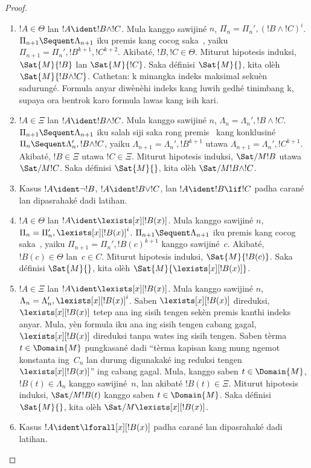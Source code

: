 \documentclass[../../../include/open-logic-section]{subfiles}
\begin{document}
\begin{proof}
\begin{enumerate}
  \item $!A \in \Theta$ lan $!A \ident !B \land !C$.
  Mula kanggo sawijiné $n$,
  $\Pi_n = \Pi_n', (!B \land !C)^i$.
  $\Pi_{n+1} \Sequent \Lambda_{n+1}$ iku premis
  kang cocog saka~\LeftR{\land}, yaiku
  $\Pi_{n+1} = \Pi_n', !B^{k+1}, !C^{k+2}$.
  Akibaté, $!B, !C \in \Theta$. Miturut hipotesis
  induksi, $\Sat{M}{!B}$ lan $\Sat{M}{!C}$.
  Saka définisi $\Sat{M}{}$, kita olèh
  $\Sat{M}{!B \land !C}$.
Cathetan: k minangka indeks maksimal sekuèn sadurungé. Formula anyar diwènèhi indeks kang luwih gedhé tinimbang k, supaya ora bentrok karo formula lawas kang isih kari.

  \item $!A \in \Xi$ lan $!A \ident !B \land !C$.
  Mula kanggo sawijiné $n$,
  $\Lambda_n = \Lambda_n', !B \land !C$.
  $\Pi_{n+1} \Sequent \Lambda_{n+1}$ iku salah siji
  saka rong premis~\RightR{\land} kang konklusiné
  $\Pi_n \Sequent \Lambda'_n, !B \land !C$, yaiku
  $\Lambda_{n+1} = \Lambda_n', !B^{k+1}$ utawa
  $\Lambda_{n+1} = \Lambda_n', !C^{k+1}$.
  Akibaté, $!B \in \Xi$ utawa $!C \in \Xi$.
  Miturut hipotesis induksi, $\Sat/{M}{!B}$ utawa
  $\Sat/{M}{!C}$. Saka définisi $\Sat{M}{}$,
  kita olèh $\Sat/{M}{!B \land !C}$.
  
  \item Kasus $!A \ident \lnot !B$,
  $!A \ident !B \lor !C$, lan
  $!A \ident !B \lif !C$ padha carané lan
  dipasrahaké dadi latihan.

  \item $!A \in \Theta$ lan
  $!A \ident \lexists[x][!B(x)]$. Mula kanggo sawijiné
  $n$, $\Pi_n = \Pi_n', \lexists[x][!B(x)]^i$.
  $\Pi_{n+1} \Sequent \Lambda_{n+1}$ iku premis
  kang cocog saka~\LeftR{\lexists}, yaiku
  $\Pi_{n+1} = \Pi_n', !B(c)^{k+1}$ kanggo sawijiné~$c$.
  Akibaté, $!B(c) \in \Theta$ lan~$c \in C$.
  Miturut hipotesis induksi, $\Sat{M}{!B(c)}$.
  Saka définisi $\Sat{M}{}$, kita olèh
  $\Sat{M}{\lexists[x][!B(x)]}$.

  \item $!A \in \Xi$ lan
  $!A \ident \lexists[x][!B(x)]$. Mula kanggo sawijiné
  $n$, $\Lambda_n = \Lambda_n', \lexists[x][!B(x)]^i$.
  Saben $\lexists[x][!B(x)]$ direduksi,
  $\lexists[x][!B(x)]$ tetep ana ing sisih tengen sekèn
  premis kanthi indeks anyar. Mula, yèn formula iku ana
  ing sisih tengen cabang gagal,
  $\lexists[x][!B(x)]$ direduksi tanpa wates ing sisih
  tengen. Saben tèrma $t \in \Domain{M}$ pungkasané dadi
  ``tèrma kapisan kang mung ngemot konstanta ing~$C_n$
  lan durung digunakaké ing reduksi tengen
  $\lexists[x][!B(x)]$'' ing cabang gagal. Mula,
  kanggo saben $t \in \Domain{M}$,
  $!B(t) \in \Lambda_n$ kanggo sawijiné~$n$,
  lan akibaté $!B(t) \in \Xi$.
  Miturut hipotesis induksi, $\Sat/{M}{!B(t)}$
  kanggo saben $t \in \Domain{M}$. Saka définisi
  $\Sat{M}{}$, kita olèh
  $\Sat/{M}{\lexists[x][!B(x)]}$.

  \item Kasus $!A \ident \lforall[x][!B(x)]$
  padha carané lan dipasrahaké dadi latihan.
\end{enumerate}
\end{proof}
\end{document}
